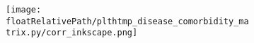 %
%

\begin{figure}[!tbp]
    \centering

    \begin{subfigure}[]{\textwidth}
        \texttt{[image: \\floatRelativePath/plthtmp\_disease\_comorbidity\_matrix.py/corr\_inkscape.png]}
    \end{subfigure}

    \caption{}
%
\end{figure}

%
%

